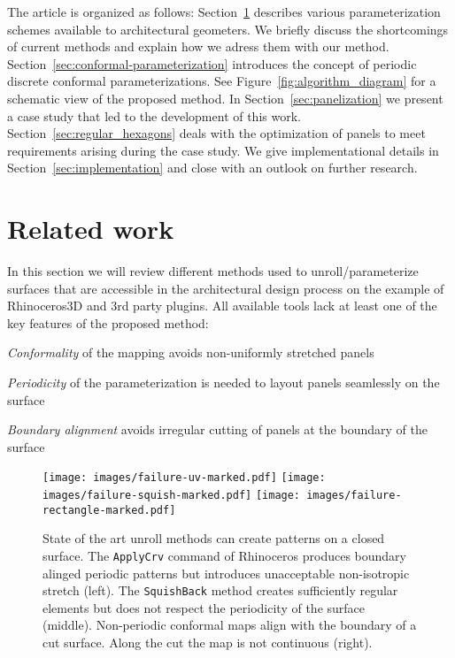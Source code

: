 \documentclass[Thesis.tex]{subfiles}
\begin{document}
The article is organized as follows:
Section~\ref{sec:parameterization} describes various parameterization
schemes available to architectural geometers. We briefly discuss the
shortcomings of current methods and explain how we adress them with our method.
Section~\ref{sec:conformal-parameterization} introduces the concept of
periodic discrete conformal parameterizations.  See
Figure~\ref{fig:algorithm_diagram} for a schematic view of the
proposed method. In Section~\ref{sec:panelization} we present a case
study that led to the development of this
work. Section~\ref{sec:regular_hexagons} deals with the optimization
of panels to meet requirements arising during the case study. We give
implementational details in Section~\ref{sec:implementation} and close
with an outlook on further research.

\section{Related work}
\label{sec:parameterization}

In this section we will review different methods used to
unroll/parameterize surfaces that are accessible in the architectural
design process on the example of Rhinoceros3D and 3rd party
plugins. All available tools lack at least one of the key features of
the proposed method:
\smallskip
\begin{compactitem}
\item \emph{Conformality} of the mapping avoids non-uniformly stretched
  panels
\item \emph{Periodicity} of the parameterization is needed to layout
  panels seamlessly on the surface
\item \emph{Boundary alignment} avoids irregular cutting of panels 
at the boundary of the surface  
\end{compactitem}

\begin{figure}[tb]
\centering
\texttt{[image: images/failure-uv-marked.pdf]}
\texttt{[image: images/failure-squish-marked.pdf]}
\texttt{[image: images/failure-rectangle-marked.pdf]}
\caption{State of the art unroll methods can create patterns on a
  closed surface.  The {\tt ApplyCrv} command of Rhinoceros produces
  boundary alinged periodic patterns but introduces unacceptable
  non-isotropic stretch (left). The {\tt SquishBack} method creates
  sufficiently regular elements but does not respect the periodicity
  of the surface (middle).  Non-periodic conformal maps align with the
  boundary of a cut surface. Along the cut the map is not continuous
  (right).}
\label{fig:failure}
\end{figure}
\end{document}
